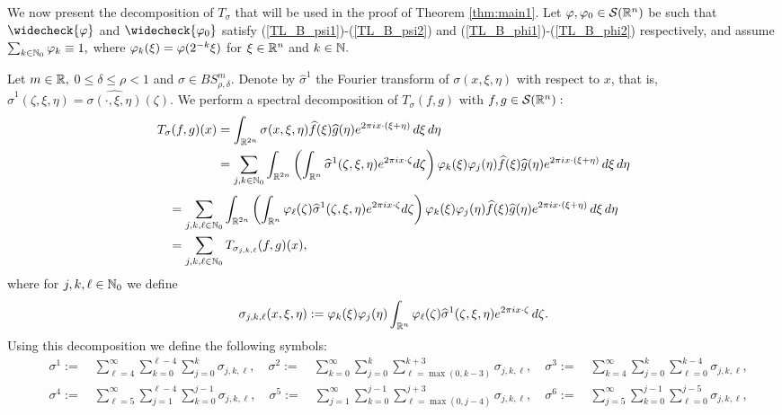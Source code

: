 We now present the decomposition of $T_\sigma$ that will be used in the proof of Theorem \ref{thm:main1}. Let $\varphi,\varphi_0 \in {\mathcal{S}}({{\mathbb R}^n})$ be such that $\widecheck{\varphi}$ and $\widecheck{\varphi_0}$ satisfy (\ref{TL_B_psi1})-(\ref{TL_B_psi2}) and (\ref{TL_B_phi1})-(\ref{TL_B_phi2}) respectively, and assume $\sum_{k \in \mathbb{N}_0} \varphi_k \equiv 1,$ where $\varphi_k(\xi)=\varphi(2^{-k}\xi)$ for $\xi\in{{\mathbb R}^n}$ and $k\in\mathbb{N}.$

Let $m \in \mathbb{R},$ $0 \leq \delta\le \rho < 1$ and $\sigma \in BS^m_{\rho, \delta}.$ Denote by $\widehat{\sigma}^1$ the Fourier transform of $\sigma(x,\xi,\eta)$ with respect to $x$, that is, $\widehat{\sigma}^1(\zeta,\xi,\eta) = \widehat{\sigma(\cdot,\xi,\eta)}(\zeta)$. We perform a spectral decomposition of $T_\sigma(f,g)$ with $f,g\in{\mathcal{S}}({{\mathbb R}^n}):$
\begin{align*}
T_\sigma(f,g)(x)&= \int_{\mathbb{R}^{2n}} \sigma(x, \xi, \eta) \widehat{f}(\xi) \widehat{g}(\eta) e^{2\pi i x \cdot (\xi + \eta)} \, d\xi \, d\eta \\
& =  \sum_{j, k \in \mathbb{N}_0} \int_{\mathbb{R}^{2n}} \left( \int_{{{\mathbb R}^n}} \widehat{\sigma}^1(\zeta, \xi, \eta) e^{2\pi i x \cdot \zeta}  d\zeta \right) \varphi_k(\xi) \varphi_j(\eta) \widehat{f}(\xi) \widehat{g}(\eta) e^{2\pi i x \cdot (\xi + \eta)} \, d\xi \, d\eta
\end{align*}
\begin{align*}
& =  \sum_{j,k,\ell\in\mathbb{N}_0} \int_{\mathbb{R}^{2n}} \left( \int_{{{\mathbb R}^n}} \varphi_\ell(\zeta)\widehat{\sigma}^1(\zeta, \xi, \eta) e^{2\pi i x \cdot \zeta}  d\zeta \right) \varphi_k(\xi) \varphi_j(\eta) \widehat{f}(\xi) \widehat{g}(\eta) e^{2\pi i x \cdot (\xi + \eta)} \, d\xi \, d\eta\\
&= \sum_{j,k,\ell\in\mathbb{N}_0}  T_{\sigma_{j,k,\ell}}(f,g)(x),
\end{align*}
where for $j,k, \ell \in \mathbb{N}_0$ we define
\begin{equation*}
\sigma_{j,k,\ell}(x, \xi, \eta):= \varphi_k(\xi) \varphi_j(\eta) \int_{{{\mathbb R}^n}}  \varphi_\ell(\zeta) \widehat{\sigma}^1(\zeta, \xi, \eta) e^{2\pi i x \cdot \zeta}  \, d\zeta.
\end{equation*}	
Using this decomposition we define the following symbols:
\begin{align*}
& \sigma^1:= \quad \sum\limits_{\ell=4}^\infty \sum\limits_{k=0}^{\ell - 4} \sum\limits_{j =0}^{k} \sigma_{j,k,\ell}, \quad \sigma^2:= \quad \sum\limits_{k=0}^\infty \sum\limits_{j=0}^k \sum\limits_{\ell =\max(0,k-3)}^{k+3} \sigma_{j,k,\ell},\quad\sigma^3:= \quad \sum\limits_{k=4}^\infty \sum\limits_{j=0}^k \sum\limits_{\ell =0}^{k-4} \sigma_{j,k,\ell},\\
&\sigma^4:= \quad \sum\limits_{\ell=5}^\infty \sum\limits_{j=1}^{\ell - 4} \sum\limits_{k =0}^{j-1} \sigma_{j,k,\ell}, \quad \sigma^5:= \quad  \sum\limits_{j=1}^\infty \sum\limits_{k=0}^{j-1} \sum\limits_{\ell =\max(0,j-4)}^{j+3} \sigma_{j,k,\ell},\quad \sigma^6:= \quad \sum\limits_{j=5}^\infty \sum\limits_{k=0}^{j-1} \sum\limits_{\ell =0}^{j-5} \sigma_{j,k,\ell},
\end{align*}
